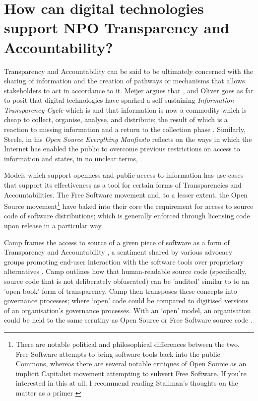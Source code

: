 \section{How can digital technologies support NPO Transparency and Accountability?}
Transparency and Accountability can be said to be ultimately concerned with the sharing of information and the creation of pathways or mechanisms that allows stakeholders to act in accordance to it. Meijer argues that  \cite{meijer_understanding_2009}, and Oliver goes as far to posit that digital technologies have sparked a self-sustaining \textit{Information - Transparency Cycle} which is  and that information is now a commodity which is cheap to collect, organise, analyse, and distribute; the result of which is a reaction to missing information and a return to the collection phase \cite{oliver_what_2004}. Similarly, Steele, in his \textit{Open Source Everything Manfiesto} reflects on the ways in which the Internet has enabled the public to overcome previous restrictions on access to information and states, in no unclear terms,  \cite{steele_open-source_2012}.

Models which support openness and public access to information has use cases that support its effectiveness as a tool for certain forms of Transparencies and Accountabilities. The Free Software movement and, to a lesser extent, the Open Source movement\footnote{There are notable political and philosophical differences between the two. Free Software attempts to bring software tools back into the public Commons, whereas there are several notable critiques of Open Source as an implicit Capitalist movement attempting to subvert Free Software. If you're interested in this at all, I recommend reading Stallman's thoughts on the matter as a primer \cite{stallman_why_2002, stallman_why_2016}} have baked into their core the requirement for access to source code of software distributions; which is generally enforced through licensing code upon release in a particular way.

Camp frames the access to source of a given piece of software as a form of Transparency and Accountability \cite{camp_varieties_2006}, a sentiment shared by various advocacy groups promoting end-user interaction with the software tools over proprietary alternatives \cite{pfaff_open_1998, balter_6_2015}. Camp outlines how that human-readable source code (specifically, source code that is not deliberately obfuscated) can be 'audited' similar to to an 'open book' form of transparency. Camp then transposes these concepts into governance processes; where `open' code could be compared to digitised versions of an organisation's governance processes. With an `open' model, an organisation could be held to the same scrutiny as Open Source or Free Software source code \cite{camp_varieties_2006}.  

